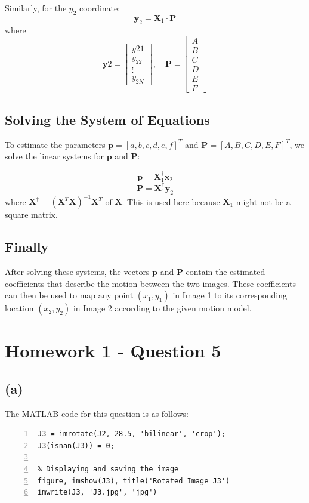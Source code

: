 \documentclass{article}
\begin{document}
Similarly, for the \(y_2\) coordinate:
\[
\mathbf{y}_2 = \mathbf{X}_1 \cdot \mathbf{P}
\]
where
\[
\mathbf{y}2 = \begin{bmatrix} y{21} \\ y_{22} \\ \vdots \\ y_{2N} \end{bmatrix}, \quad
\mathbf{P} = \begin{bmatrix} A \\ B \\ C \\ D \\ E \\ F \end{bmatrix}
\]

\subsection*{Solving the System of Equations}
To estimate the parameters \( \mathbf{p} = [a, b, c, d, e, f]^T \) and \( \mathbf{P} = [A, B, C, D, E, F]^T \), we solve the linear systems for \( \mathbf{p} \) and \( \mathbf{P} \):

\[
\mathbf{p} = \mathbf{X}_1^\dagger \mathbf{x}_2
\]
\[
\mathbf{P} = \mathbf{X}_1^\dagger \mathbf{y}_2
\]
where \( \mathbf{X}^\dagger = (\mathbf{X}^T \mathbf{X})^{-1} \mathbf{X}^T
\) of \( \mathbf{X} \). This is used here because \( \mathbf{X}_1 \) might not be a square matrix.

\subsection*{Finally}
After solving these systems, the vectors \( \mathbf{p} \) and \( \mathbf{P} \) contain the estimated coefficients that describe the motion between the two images. These coefficients can then be used to map any point \( (x_1, y_1) \) in Image 1 to its corresponding location \( (x_2, y_2) \) in Image 2 according to the given motion model.

\newpage
\section{Homework 1 - Question 5}

\subsection*{(a)}

The MATLAB code for this question is as follows:
\begin{lstlisting}[frame=single,numbers=left,style=Matlab-Pyglike]    
J3 = imrotate(J2, 28.5, 'bilinear', 'crop');
J3(isnan(J3)) = 0;

% Displaying and saving the image
figure, imshow(J3), title('Rotated Image J3')
imwrite(J3, 'J3.jpg', 'jpg')
\end{lstlisting}
\end{document}
